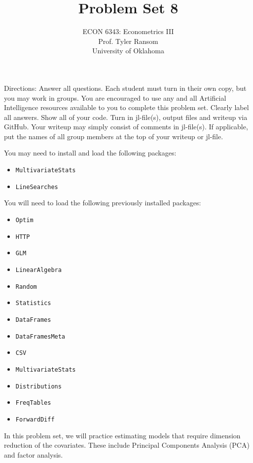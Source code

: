 \documentclass[12pt,english]{article}
\begin{document}
\title{Problem Set 8}
\author{ECON 6343: Econometrics III\\
Prof. Tyler Ransom\\
University of Oklahoma}
\date{}%

\maketitle
Directions: Answer all questions. Each student must turn in their own copy, but you may work in groups. You are encouraged to use any and all Artificial Intelligence resources available to you to complete this problem set. Clearly label all answers. Show all of your code. Turn in jl-file(s), output files and writeup via GitHub. Your writeup may simply consist of comments in jl-file(s). If applicable, put the names of all group members at the top of your writeup or jl-file.

You may need to install and load the following packages:
\begin{itemize}
 \item[~] \texttt{MultivariateStats}
 \item[~] \texttt{LineSearches}
\end{itemize}

You will need to load the following previously installed packages:
\begin{itemize}
    \item[~] \texttt{Optim} 
    \item[~] \texttt{HTTP} 
    \item[~] \texttt{GLM} 
    \item[~] \texttt{LinearAlgebra} 
    \item[~] \texttt{Random} 
    \item[~] \texttt{Statistics} 
    \item[~] \texttt{DataFrames} 
    \item[~] \texttt{DataFramesMeta} 
    \item[~] \texttt{CSV} 
    \item[~] \texttt{MultivariateStats} 
    \item[~] \texttt{Distributions} 
    \item[~] \texttt{FreqTables} 
    \item[~] \texttt{ForwardDiff} 
\end{itemize}
\pagebreak
In this problem set, we will practice estimating models that require dimension reduction of the covariates. These include Principal Components Analysis (PCA) and factor analysis.
\end{document}

